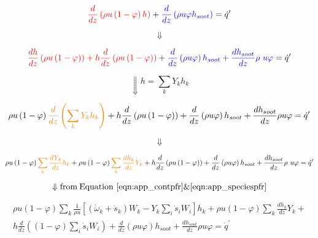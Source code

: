 \begin{equation*}
	\color{red}
	\frac{d}{dz}\left(\rho u\left(1-\varphi\right)h\right)
	\color{black}
	+
	\color{blue}
	\frac{d}{dz}\left(\rho u\varphi h_{soot}\right)
	\color{black}
	={\dot{q}}^\prime
\end{equation*}

\begin{equation*}
	\Downarrow
\end{equation*}


\begin{equation*}
	\color{red}
	\frac{dh}{dz}\left(\rho u\left(1-\varphi\right)\right)+h\frac{d}{dz}\left(\rho u\left(1-\varphi\right)\right)
	\color{black}
	+
	\color{blue}
	\frac{d}{dz}\left(\rho u\varphi\right)h_{soot}+\frac{dh_{soot}}{dz}\rho\ u\varphi
	\color{black}
	={\dot{q}}^\prime
\end{equation*}

\begin{equation*}
	\Downarrow h=\sum_{k}{Y_kh_k}
\end{equation*}

\begin{equation*}
	\rho u\left(1-\varphi\right)
	\color{orange}
	\frac{d}{dz}\left(
	\sum_{k}{Y_k h_k}\right)
	\color{black}
	+
	h
	\frac{d}{dz}\left(\rho u\left(1-\varphi\right)\right)
	+
	\frac{d}{dz}\left(\rho u\varphi\right)h_{soot}+\frac{dh_{soot}}{dz}\rho u\varphi={\dot{q}}^\prime
\end{equation*}

\begin{equation*}
	\Downarrow
\end{equation*}

\begin{equation*}
	\rho u\left(1-\varphi\right)
	\color{orange}\sum_{k}{\frac{dY_k}{dz}h_k}
	\color{black}
	+
	\rho u\left(1-\varphi\right)
	\color{orange}\sum_{k}{\frac{dh_k}{dz}Y_k}
	\color{black}
	+
	h\frac{d}{dz}\left(\rho u\left(1-\varphi\right)\right)
	+
	\color{black}
	\frac{d}{dz}\left(\rho u\varphi\right)h_{soot}+\frac{dh_{soot}}{dz}\rho\ u\varphi={\dot{q}}^\prime
\end{equation*}


\begin{equation*}
	\Downarrow \mathrm{from \: Equation~\eqref{eqn:app_contpfr} \& \eqref{eqn:app_speciespfr}}
\end{equation*}


\begin{equation*}
	\begin{split}
	\rho 
	u\left(1-\varphi\right)
	\sum_{k}
	{\frac{1}{\rho u}
	\left[
		({\dot{\omega}}_k+{\dot{s}}_k)W_k-Y_k\sum_{i}{{\dot{s}}_iW_i}
	\right]h_k}
	+
	\rho u\left(1-\varphi\right)\sum_{k}{\frac{dh_k}{dz}Y_k}
	+ \\
	h\frac{d}{dz}
	\left(
		(1-\varphi)\sum_{i}{{\dot{s}}_iW_i}
	\right)
	+\frac{d}{dz}\left(\rho u\varphi\right)h_{soot}
	+
	\frac{dh_{soot}}{dz}\rho u\varphi={\dot{q}}^\prime
	\end{split}	
\end{equation*}

